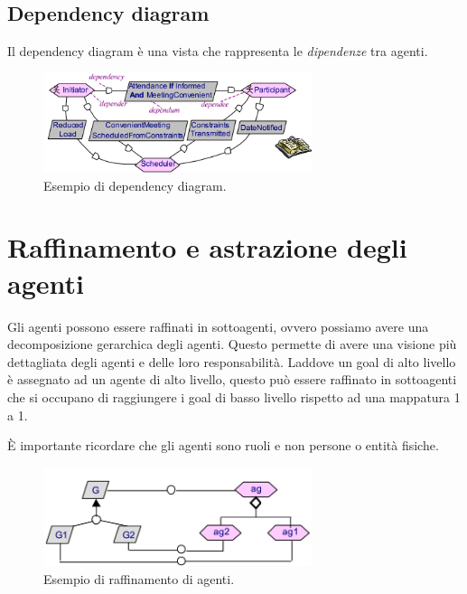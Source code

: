 \subsection{Dependency diagram}
\begin{tcolorbox}[colback=yellow!5!white,colframe=yellow!75!black, title=Dependency diagram]
    Il dependency diagram è una vista che rappresenta le \textit{dipendenze} tra agenti.
\end{tcolorbox}
\begin{figure}[H]
    \centering
    \includegraphics[width=0.7\textwidth]{img/dependencydiagram.png}
    \caption{Esempio di dependency diagram.}
    \label{fig:dependencydiagram}
\end{figure}
\section{Raffinamento e astrazione degli agenti}
Gli agenti possono essere raffinati in sottoagenti, ovvero possiamo avere una
decomposizione gerarchica degli agenti. Questo permette di avere una visione
più dettagliata degli agenti e delle loro responsabilità.
Laddove un goal di alto livello è assegnato ad un agente di alto livello, questo
può essere raffinato in sottoagenti che si occupano di raggiungere i goal di
basso livello rispetto ad una mappatura 1 a 1.

\begin{tcolorbox}
    È importante ricordare che gli agenti sono ruoli e non persone o entità fisiche.
\end{tcolorbox}
\begin{figure}[H]
    \centering
    \includegraphics[width=0.7\textwidth]{img/agentraf.png}
    \caption{Esempio di raffinamento di agenti.}
    \label{fig:refinement}
\end{figure}

